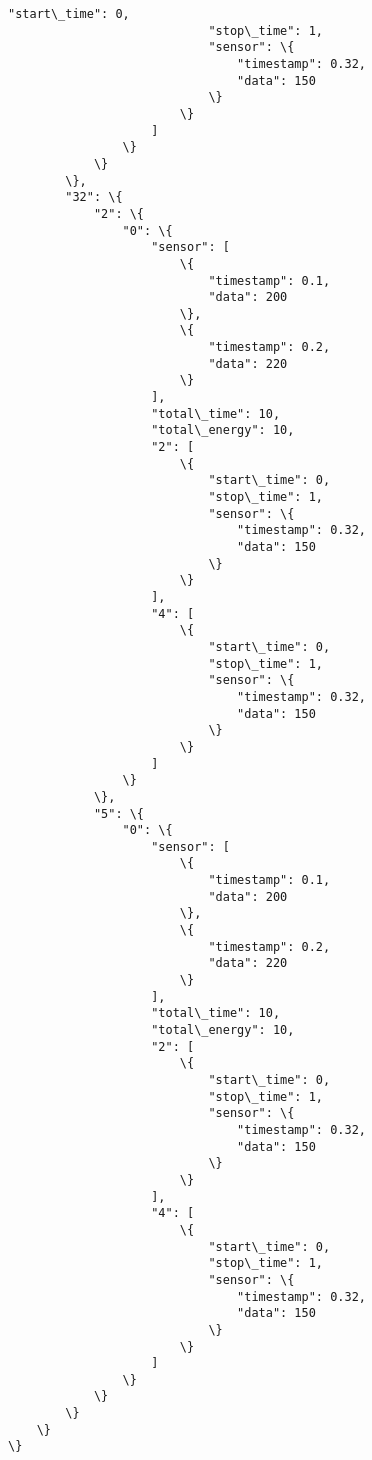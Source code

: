 \documentclass[11pt]{article}
\begin{document}
\begin{Verbatim}[commandchars=\\\{\}]
                            "start\_time": 0,
                            "stop\_time": 1,
                            "sensor": \{
                                "timestamp": 0.32,
                                "data": 150
                            \}
                        \}
                    ]
                \}
            \}
        \},
        "32": \{
            "2": \{
                "0": \{
                    "sensor": [
                        \{
                            "timestamp": 0.1,
                            "data": 200
                        \},
                        \{
                            "timestamp": 0.2,
                            "data": 220
                        \}
                    ],
                    "total\_time": 10,
                    "total\_energy": 10,
                    "2": [
                        \{
                            "start\_time": 0,
                            "stop\_time": 1,
                            "sensor": \{
                                "timestamp": 0.32,
                                "data": 150
                            \}
                        \}
                    ],
                    "4": [
                        \{
                            "start\_time": 0,
                            "stop\_time": 1,
                            "sensor": \{
                                "timestamp": 0.32,
                                "data": 150
                            \}
                        \}
                    ]
                \}
            \},
            "5": \{
                "0": \{
                    "sensor": [
                        \{
                            "timestamp": 0.1,
                            "data": 200
                        \},
                        \{
                            "timestamp": 0.2,
                            "data": 220
                        \}
                    ],
                    "total\_time": 10,
                    "total\_energy": 10,
                    "2": [
                        \{
                            "start\_time": 0,
                            "stop\_time": 1,
                            "sensor": \{
                                "timestamp": 0.32,
                                "data": 150
                            \}
                        \}
                    ],
                    "4": [
                        \{
                            "start\_time": 0,
                            "stop\_time": 1,
                            "sensor": \{
                                "timestamp": 0.32,
                                "data": 150
                            \}
                        \}
                    ]
                \}
            \}
        \}
    \}
\}

    \end{Verbatim}
\end{document}
